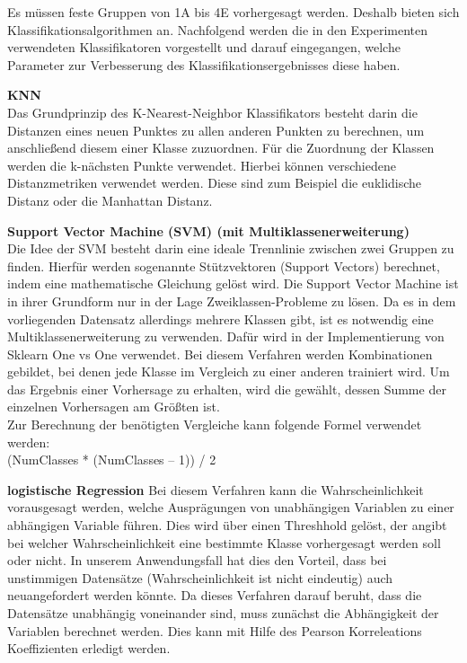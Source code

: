 

Es müssen feste Gruppen von 1A bis 4E vorhergesagt werden. Deshalb bieten sich Klassifikationsalgorithmen an.
Nachfolgend werden die in den Experimenten verwendeten Klassifikatoren vorgestellt und darauf eingegangen, welche Parameter zur Verbesserung des Klassifikationsergebnisses diese haben.

\textbf{KNN} \\
Das Grundprinzip des K-Nearest-Neighbor Klassifikators besteht darin die Distanzen eines neuen Punktes zu allen anderen Punkten zu berechnen, um anschließend diesem einer Klasse zuzuordnen.
Für die Zuordnung der Klassen werden die k-nächsten Punkte verwendet.
Hierbei können verschiedene Distanzmetriken verwendet werden. 
Diese sind zum Beispiel die euklidische Distanz oder die Manhattan Distanz.


\textbf{Support Vector Machine (SVM) (mit Multiklassenerweiterung)} \\
Die Idee der SVM besteht darin eine ideale Trennlinie zwischen zwei Gruppen zu finden. 
Hierfür werden sogenannte Stützvektoren (Support Vectors) berechnet, indem eine mathematische Gleichung gelöst wird.
Die Support Vector Machine ist in ihrer Grundform nur in der Lage Zweiklassen-Probleme zu lösen.
Da es in dem vorliegenden Datensatz allerdings mehrere Klassen gibt, ist es notwendig eine Multiklassenerweiterung zu verwenden.
Dafür wird in der Implementierung von Sklearn One vs One verwendet. 
Bei diesem Verfahren werden Kombinationen gebildet, bei denen jede Klasse im Vergleich zu einer anderen trainiert wird.
Um das Ergebnis einer Vorhersage zu erhalten, wird die gewählt, dessen Summe der einzelnen Vorhersagen am Größten ist. 
\\ 
Zur Berechnung der benötigten Vergleiche kann folgende Formel verwendet werden:\\
(NumClasses * (NumClasses – 1)) / 2


\textbf{logistische Regression} %
Bei diesem Verfahren kann die Wahrscheinlichkeit vorausgesagt werden, welche Ausprägungen von unabhängigen Variablen zu einer abhängigen Variable führen. 
Dies wird über einen Threshhold gelöst, der angibt bei welcher Wahrscheinlichkeit eine bestimmte Klasse vorhergesagt werden soll oder nicht.
In unserem Anwendungsfall hat dies den Vorteil, dass bei unstimmigen Datensätze (Wahrscheinlichkeit ist nicht eindeutig) auch neuangefordert werden könnte. 
Da dieses Verfahren darauf beruht, dass die Datensätze unabhängig voneinander sind, muss zunächst die Abhängigkeit der Variablen berechnet werden.
Dies kann mit Hilfe des Pearson Korreleations Koeffizienten erledigt werden.

